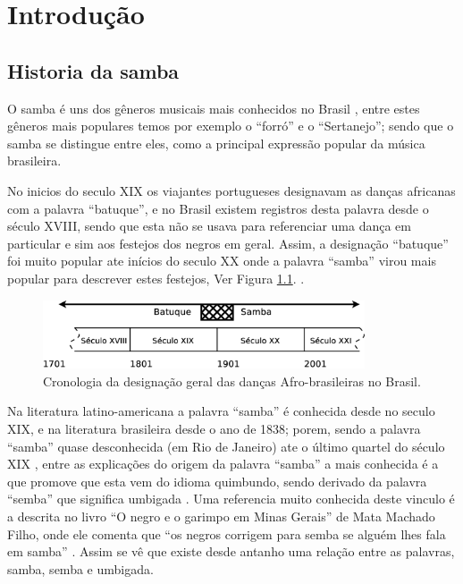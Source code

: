 
\chapter{Introdução}
\section{Historia da samba}
O samba é uns dos gêneros musicais mais conhecidos no Brasil \cite[pp. 46-47]{diniz2008almanaque},
entre estes gêneros mais populares temos por exemplo o ``forró'' e o ``Sertanejo'';
sendo que o samba se distingue entre eles, como a principal expressão popular da música brasileira. 



No inicios do seculo XIX os viajantes portugueses designavam as danças africanas com a palavra ``batuque'',
e no Brasil existem registros desta palavra desde o século XVIII, sendo que
esta não se usava para referenciar uma dança em particular e sim aos festejos dos negros em geral.
Assim, a designação  ``batuque'' foi muito popular ate inícios do seculo XX onde a palavra ``samba''
 virou mais popular para descrever estes festejos, Ver Figura \ref{fig:sambacrono}. 
\cite[pp. 85]{sandroni2001feitico} \cite[pp. 47]{diniz2008almanaque}.
\begin{figure}[h]
  \centering
    \includegraphics[width=0.85\textwidth]{chapters/cap-intro/samba-crono.eps}
  \caption{Cronologia da designação geral das danças Afro-brasileiras no Brasil.}
  \label{fig:sambacrono}
\end{figure}

Na literatura latino-americana a palavra ``samba'' é conhecida desde no seculo XIX, 
e na literatura brasileira desde o ano de 1838; porem, sendo a palavra ``samba''
quase desconhecida (em Rio de Janeiro) ate o último quartel do século XIX  \cite[pp. 47]{diniz2008almanaque}\cite[pp. 86]{sandroni2001feitico},
entre as explicações
do origem da palavra ``samba'' a mais conhecida é a que promove que esta vem 
do idioma quimbundo, sendo derivado da palavra ``semba''  que significa umbigada \cite[pp. 47]{diniz2008almanaque} \cite[pp. 50]{da2015historia}.
Uma referencia muito conhecida deste vinculo é a descrita no livro ``O negro e o garimpo em Minas Gerais''
de Mata Machado Filho, onde ele comenta que ``os negros corrigem para semba se 
alguém lhes fala em samba'' \cite[pp. 85]{sandroni2001feitico}. Assim se vê que existe
desde antanho uma relação entre as palavras, 
samba, semba e umbigada.


